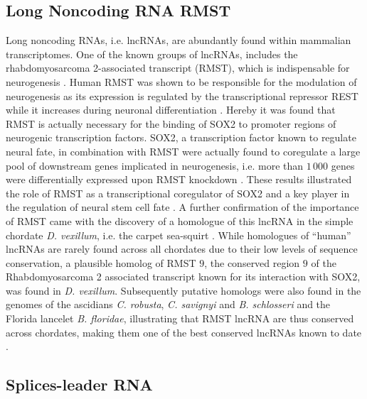 \documentclass[graybox]{svmult}
\begin{document}
\subsection{Long Noncoding RNA RMST}

Long noncoding RNAs, i.e. lncRNAs, are abundantly found within mammalian 
transcriptomes. One of the known groups of lncRNAs, includes the 
rhabdomyosarcoma 2-associated transcript (RMST), which is indispensable for 
neurogenesis \citep{Bogu2013}. 
Human RMST was shown to be responsible for the modulation of neurogenesis as 
its expression is regulated by the transcriptional repressor REST while it 
increases during neuronal differentiation \citep{Bogu2013}. Hereby it was 
found that RMST is actually necessary for the binding of SOX2 to promoter 
regions of neurogenic transcription factors. SOX2, a transcription factor known 
to regulate neural fate, in combination with RMST were actually found to 
coregulate a large pool of downstream genes implicated in neurogenesis, i.e. 
more than $1\,000$ genes were differentially expressed upon RMST knockdown 
\citep{Bogu2013}. These results illustrated the role of RMST as a 
transcriptional coregulator of SOX2 and a key player in the regulation of 
neural stem cell fate \citep{Bogu2013}. A further confirmation of the importance 
of RMST came with the discovery of a homologue of this lncRNA in the simple 
chordate \textit{D. vexillum}, i.e. the carpet sea-squirt 
\citep{Velandia-Huerto2016}. While homologues of ``human'' lncRNAs are 
rarely found across all chordates due to their low levels of sequence 
conservation, a plausible homolog of RMST $9$, the conserved region $9$ of the 
Rhabdomyosarcoma 2 associated transcript known for its interaction with SOX2, 
was found in \textit{D. vexillum}. Subsequently putative homologs were also 
found in the genomes of the ascidians \textit{C. robusta}, \textit{C. 
savignyi} and \textit{B. schlosseri} and the Florida lancelet \textit{B. 
floridae}, illustrating that RMST lncRNA are thus conserved across chordates, 
making them one of the best conserved lncRNAs known to date 
\citep{Velandia-Huerto2016}.

\subsection{Splices-leader RNA}
\end{document}
